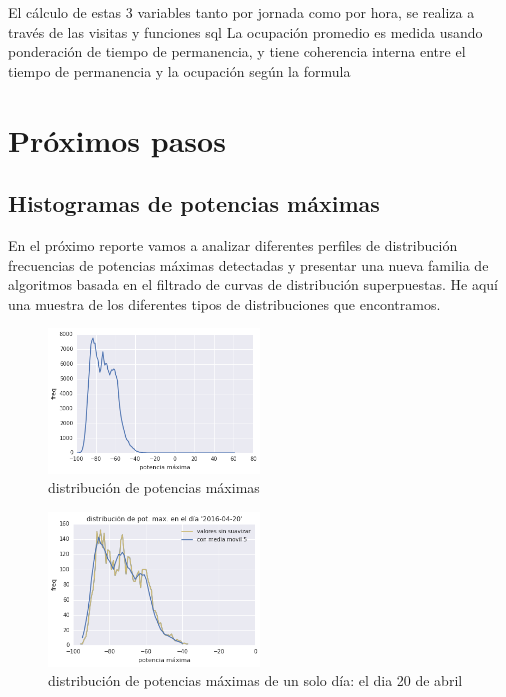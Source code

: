 El cálculo de estas 3 variables tanto por jornada
como por hora,
se realiza a través de las visitas y funciones sql
La ocupación promedio es medida usando ponderación de tiempo de permanencia, y tiene  coherencia interna entre el tiempo de permanencia y la ocupación según la formula 

\section{Próximos pasos}

\subsection{Histogramas de potencias máximas}
En el próximo reporte vamos a analizar diferentes perfiles de distribución frecuencias de potencias máximas detectadas y presentar una nueva familia de algoritmos basada en el filtrado de curvas de distribución superpuestas. He aquí una muestra de los diferentes tipos de distribuciones que encontramos.

\begin{figure}[H] 
  \centering
  \includegraphics[width=0.5\textwidth]{pot_max.png}
  \caption{distribución de potencias máximas}
  \label{fig:pot_max_total}
\end{figure}

\begin{figure}[H] 
  \centering
  \includegraphics[width=0.5\textwidth]{pot_max_2016-04-20.png}
  \caption{distribución de potencias máximas de un solo día: el dia 20 de abril}
  \label{fig:pot_max_1_dia}
\end{figure}

